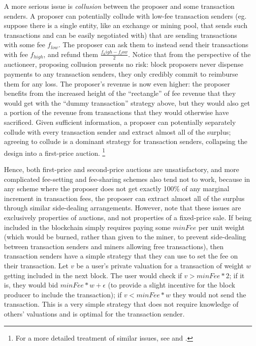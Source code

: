 \documentclass[12pt, final]{article}
\begin{document}
A more serious issue is \emph{collusion} between the proposer and some transaction senders. A proposer can potentially collude with low-fee transaction senders (eg. suppose there is a single entity, like an exchange or mining pool, that sends such transactions and can be easily negotiated with) that are sending transactions with some fee $f_{low}$. The proposer can ask them to instead send their transactions with fee $f_{high}$, and refund them $\frac{f_high - f_low}{2}$. Notice that from the perspective of the auctioneer, proposing collusion presents no risk: block proposers never dispense payments to any transaction senders, they only credibly commit to reimburse them for any loss. The proposer's revenue is now even higher: the proposer benefits from the increased height of the ``rectangle'' of fee revenue that they would get with the ``dummy transaction'' strategy above, but they would also get a portion of the revenue from transactions that they would otherwise have sacrificed. Given sufficient information, a proposer can potentially separately collude with every transaction sender and extract almost all of the surplus; agreeing to collude is a dominant strategy for transaction senders, collapsing the design into a first-price auction. \footnote{For a more detailed treatment of similar issues, see \cite{li2018} and \cite{rothkopf2007}.}

Hence, both first-price and second-price auctions are unsatisfactory, and more complicated fee-setting and fee-sharing schemes also tend not to work, because in any scheme where the proposer does not get exactly 100\% of any marginal increment in transaction fees, the proposer can extract almost all of the surplus through similar side-dealing arrangements. However, note that these issues are exclusively properties of auctions, and not properties of a fixed-price sale. If being included in the blockchain simply requires paying some $minFee$ per unit weight (which would be burned, rather than given to the miner, to prevent side-dealing between transaction senders and miners allowing free transactions), then transaction senders have a simple strategy that they can use to set the fee on their transaction. Let $v$ be a user's private valuation for a transaction of weight $w$ getting included in the next block. The user would check if $v > minFee * 2$; if it is, they would bid $minFee * w + \epsilon$ (to provide a slight incentive for the block producer to include the transaction); if $v < minFee * w$ they would not send the transaction. This is a very simple strategy that does not require knowledge of others' valuations and is optimal for the transaction sender.
\end{document}
